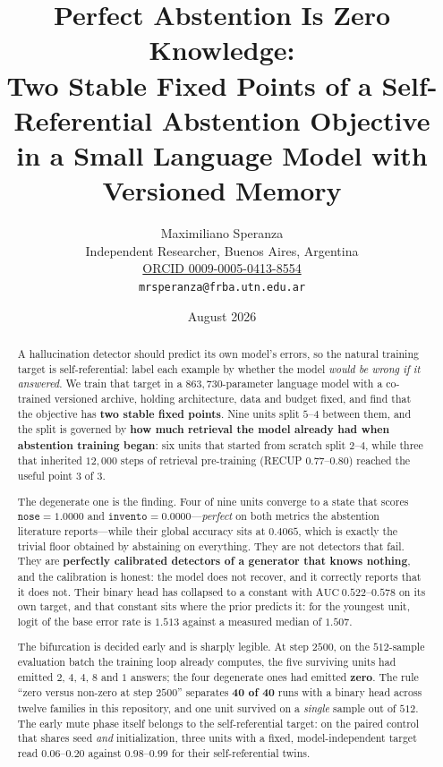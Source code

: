 \documentclass[11pt,a4paper]{article}
\title{\bfseries Perfect Abstention Is Zero Knowledge:\\
Two Stable Fixed Points of a Self-Referential Abstention Objective\\
in a Small Language Model with Versioned Memory}
\author{Maximiliano Speranza\\
\small Independent Researcher, Buenos Aires, Argentina\\
\small \href{https://orcid.org/0009-0005-0413-8554}{ORCID 0009-0005-0413-8554}\\
\small \texttt{mrsperanza@frba.utn.edu.ar}}
\date{August 2026}
\begin{document}
\maketitle

\begin{abstract}
\noindent
A hallucination detector should predict its own model's errors, so the natural training target is
self-referential: label each example by whether the model \emph{would be wrong if it answered}. We
train that target in a $863{,}730$-parameter language model with a co-trained versioned archive,
holding architecture, data and budget fixed, and find that the objective has \textbf{two stable fixed
points}. Nine units split $5$--$4$ between them, and the split is governed by \textbf{how much
retrieval the model already had when abstention training began}: six units that started from scratch
split $2$--$4$, while three that inherited $12{,}000$ steps of retrieval pre-training (RECUP
$0.77$--$0.80$) reached the useful point $3$ of $3$.

The degenerate one is the finding. Four of nine units converge to a state that scores
$\texttt{nose} = 1.0000$ and $\texttt{invento} = 0.0000$---\emph{perfect} on both metrics the
abstention literature reports---while their global accuracy sits at $0.4065$, which is exactly the
trivial floor obtained by abstaining on everything. They are not detectors that fail. They are
\textbf{perfectly calibrated detectors of a generator that knows nothing}, and the calibration is
honest: the model does not recover, and it correctly reports that it does not. Their binary head has
collapsed to a constant with $\mathrm{AUC}\ 0.522$--$0.578$ on its own target, and that constant sits
where the prior predicts it: for the youngest unit, $\mathrm{logit}$ of the base error rate is
$1.513$ against a measured median of $1.507$.

The bifurcation is decided early and is sharply legible. At step $2500$, on the $512$-sample
evaluation batch the training loop already computes, the five surviving units had emitted
$2$, $4$, $4$, $8$ and $1$ answers; the four degenerate ones had emitted \textbf{zero}. The rule
``zero versus non-zero at step $2500$'' separates \textbf{40 of 40} runs with a binary head across
twelve families in this repository, and one unit survived on a \emph{single} sample out of $512$.
The early mute phase itself belongs to the self-referential target: on the paired control that
shares seed \emph{and} initialization, three units with a fixed, model-independent target read
$0.06$--$0.20$ against $0.98$--$0.99$ for their self-referential twins.


\end{abstract}
\end{document}

